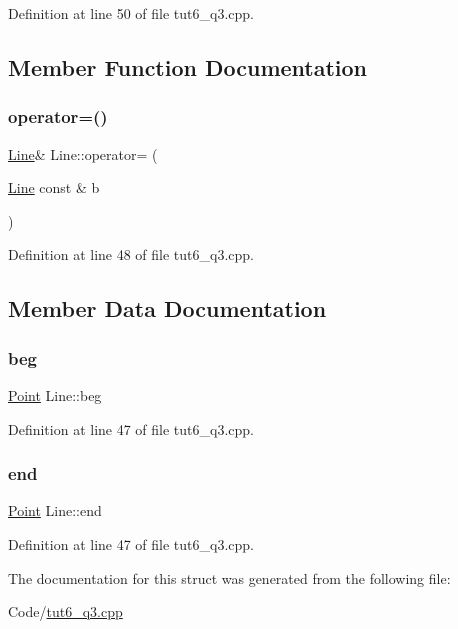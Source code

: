 Definition at line 50 of file tut6\+\_\+q3.\+cpp.



\subsection{Member Function Documentation}
\mbox{\label{struct_line_a70001f8a33928acfc16bd9d362d57aad}} 
\subsubsection{\texorpdfstring{operator=()}{operator=()}}
{\footnotesize\ttfamily \hyperlink{struct_line}{Line}\& Line\+::operator= (\begin{DoxyParamCaption}\item[{\hyperlink{struct_line}{Line} const \&}]{b }\end{DoxyParamCaption})\hspace{0.3cm}{\ttfamily [inline]}}



Definition at line 48 of file tut6\+\_\+q3.\+cpp.



\subsection{Member Data Documentation}
\mbox{\label{struct_line_a1a2e587cf1378a7cb7eb66a80065f226}} 
\subsubsection{\texorpdfstring{beg}{beg}}
{\footnotesize\ttfamily \hyperlink{struct_point}{Point} Line\+::beg}



Definition at line 47 of file tut6\+\_\+q3.\+cpp.

\mbox{\label{struct_line_afca8cb662b46ae1724b7c38c3eab2069}} 
\subsubsection{\texorpdfstring{end}{end}}
{\footnotesize\ttfamily \hyperlink{struct_point}{Point} Line\+::end}



Definition at line 47 of file tut6\+\_\+q3.\+cpp.



The documentation for this struct was generated from the following file\+:\begin{DoxyCompactItemize}
\item 
Code/\hyperlink{tut6__q3_8cpp}{tut6\+\_\+q3.\+cpp}\end{DoxyCompactItemize}
